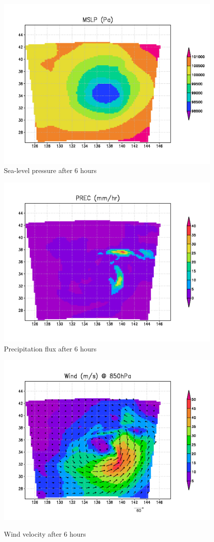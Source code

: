 \begin{figure}[tbh]
\begin{center}
  \includegraphics[width=0.55\hsize]{./figure/real_mslp.png}\\
  \caption{Sea-level pressure after 6 hours}
  \label{fig:real_mslp}
\end{center}
\begin{center}
  \includegraphics[width=0.55\hsize]{./figure/real_prec.png}\\
  \caption{Precipitation flux after 6 hours}
  \label{fig:real_prec}
\end{center}
\begin{center}
  \includegraphics[width=0.55\hsize]{./figure/real_wind.png}\\
  \caption{Wind velocity after 6 hours}
  \label{fig:real_wind}
\end{center}
\end{figure}

